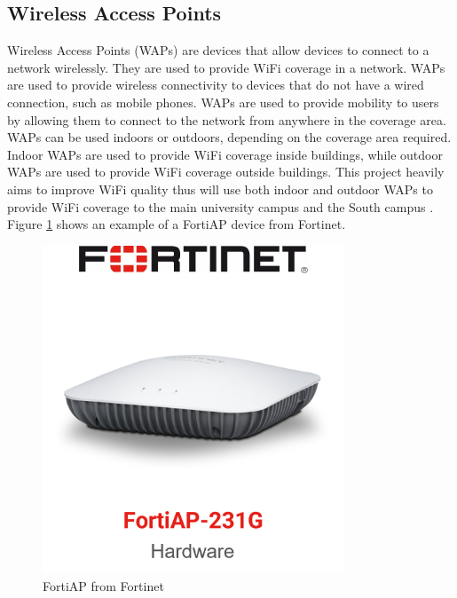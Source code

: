 \documentclass[12pt]{report}
\begin{document}
\subsection{Wireless Access Points}
Wireless Access Points (WAPs) are devices that allow devices to connect to a network wirelessly. They are used to provide WiFi coverage in a network. WAPs are used to provide wireless connectivity to devices that do not have a wired connection, such as mobile phones. WAPs are used to provide mobility to users by allowing them to connect to the network from anywhere in the coverage area. WAPs can be used indoors or outdoors, depending on the coverage area required. Indoor WAPs are used to provide WiFi coverage inside buildings, while outdoor WAPs are used to provide WiFi coverage outside buildings. This project heavily aims to improve WiFi quality thus will use both indoor and outdoor WAPs to provide WiFi coverage to the main university campus and the South campus \cite{FortiAP}.
Figure \ref{fig:FortiAP} shows an example of a FortiAP device from Fortinet. 
\begin{figure}[h]
    \centering
    \includegraphics[width=0.8\textwidth]{images/AP.png}
    \caption{FortiAP from Fortinet \cite{FAPIMG}}
    \label{fig:FortiAP}
\end{figure}
\end{document}
